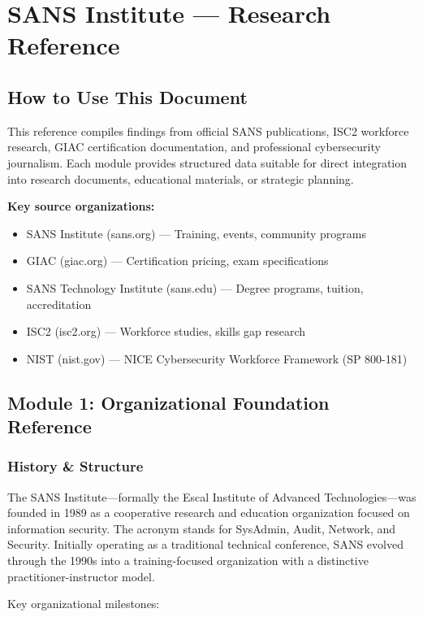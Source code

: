 \documentclass[11pt,letterpaper]{article}
\begin{document}
\section{SANS Institute --- Research Reference}

\subsection{How to Use This Document}

This reference compiles findings from official SANS publications, ISC2 workforce research, GIAC certification documentation, and professional cybersecurity journalism. Each module provides structured data suitable for direct integration into research documents, educational materials, or strategic planning.

\textbf{Key source organizations:}
\begin{itemize}[nosep]
  \item SANS Institute (sans.org) --- Training, events, community programs
  \item GIAC (giac.org) --- Certification pricing, exam specifications
  \item SANS Technology Institute (sans.edu) --- Degree programs, tuition, accreditation
  \item ISC2 (isc2.org) --- Workforce studies, skills gap research
  \item NIST (nist.gov) --- NICE Cybersecurity Workforce Framework (SP 800-181)
\end{itemize}

\subsection{Module 1: Organizational Foundation Reference}

\subsubsection{History \& Structure}

The SANS Institute---formally the Escal Institute of Advanced Technologies---was founded in 1989 as a cooperative research and education organization focused on information security. The acronym stands for SysAdmin, Audit, Network, and Security. Initially operating as a traditional technical conference, SANS evolved through the 1990s into a training-focused organization with a distinctive practitioner-instructor model.

Key organizational milestones:
\end{document}
